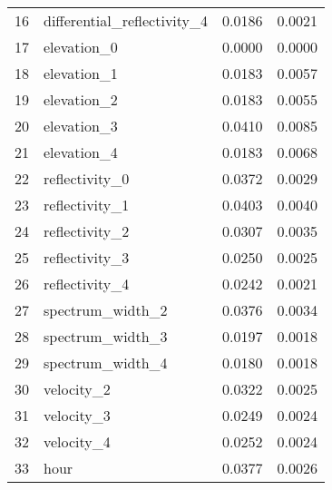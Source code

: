 \documentclass{agujournal}
\begin{document}
\begin{table}[!h]
\begin{center}
\begin{tabular}{llrr}
16 &  differential\_reflectivity\_4 &      0.0186 &              0.0021 \\
17 &                  elevation\_0 &      0.0000 &              0.0000 \\
18 &                  elevation\_1 &      0.0183 &              0.0057 \\
19 &                  elevation\_2 &      0.0183 &              0.0055 \\
20 &                  elevation\_3 &      0.0410 &              0.0085 \\
21 &                  elevation\_4 &      0.0183 &              0.0068 \\
22 &               reflectivity\_0 &      0.0372 &              0.0029 \\
23 &               reflectivity\_1 &      0.0403 &              0.0040 \\
24 &               reflectivity\_2 &      0.0307 &              0.0035 \\
25 &               reflectivity\_3 &      0.0250 &              0.0025 \\
26 &               reflectivity\_4 &      0.0242 &              0.0021 \\
27 &             spectrum\_width\_2 &      0.0376 &              0.0034 \\
28 &             spectrum\_width\_3 &      0.0197 &              0.0018 \\
29 &             spectrum\_width\_4 &      0.0180 &              0.0018 \\
30 &                   velocity\_2 &      0.0322 &              0.0025 \\
31 &                   velocity\_3 &      0.0249 &              0.0024 \\
32 &                   velocity\_4 &      0.0252 &              0.0024 \\
33 &                         hour &      0.0377 &              0.0026 \\
\bottomrule
\end{tabular}
\end{center}
\end{table}

\medskip



\clearpage

\pagebreak

%
%
\end{document}
